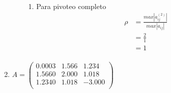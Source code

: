 \begin{enumerate}[]
\begin{enumerate}[]
\begin{enumerate}[]
             \item Para pivoteo completo
             \begin{align*}
                \rho &=  \frac{max |a_{ij}^{(2)}|}{max |a_{ij}|}\\
                &=  \frac{2}{1}\\
                &=  1\\
            \end{align*}
        \end{enumerate}
    \end{enumerate}
    
    \item 
    $A = \begin{pmatrix}
            0.0003 & 1.566 &  1.234 \\ 
            1.5660 & 2.000 &  1.018 \\
            1.2340 & 1.018 & -3.000 \\
        \end{pmatrix}$
    

\end{enumerate}
